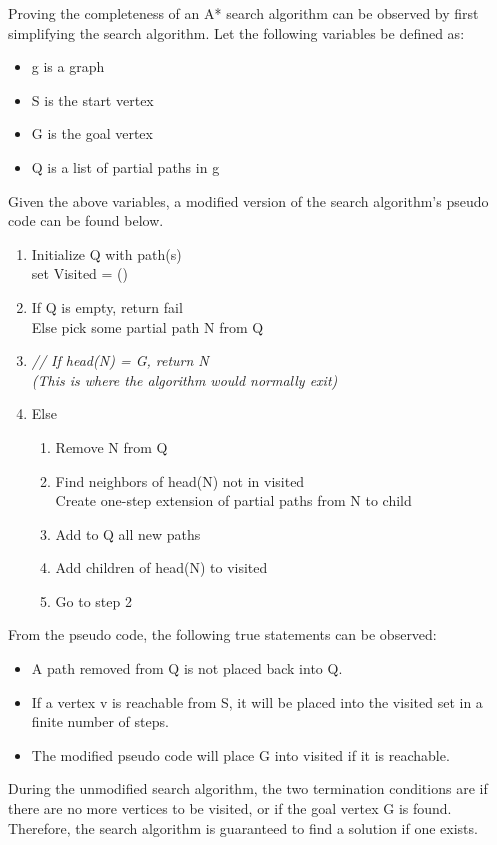 \documentclass[12pt]{article}
\begin{document}
		Proving the completeness of an A* search algorithm can be observed by first simplifying the search algorithm.  Let the following variables be defined as: 
		\begin{itemize}
			\item g is a graph
			\item S is the start vertex
			\item G is the goal vertex
			\item Q is a list of partial paths in g
		\end{itemize}
		Given the above variables, a modified version of the search algorithm's pseudo code can be found below.
		\begin{enumerate}
			\item Initialize Q with path(s)\\
			set Visited = ()
			\item If Q is empty, return fail\\
			Else pick some partial path N from Q
			\item \textit{// If head(N) = G, return N \\ (This is where the algorithm would normally exit)}
			\item Else
			\begin{enumerate}
				\item Remove N from Q
				\item Find neighbors of head(N) not in visited\\
				Create one-step extension of partial paths from N to child
				\item Add to Q all new paths
				\item Add children of head(N) to visited
				\item Go to step 2
			\end{enumerate}
		\end{enumerate}
	
		From the pseudo code, the following true statements can be observed:
		\begin{itemize}
			\item A path removed from Q is not placed back into Q.
			\item If a vertex v is reachable from S, it will be placed into the visited set in a finite number of steps.
			\item The modified pseudo code will place G into visited if it is reachable.
		\end{itemize}
		During the unmodified search algorithm, the two termination conditions are if there are no more vertices to be visited, or if the goal vertex G is found.  Therefore, the search algorithm is guaranteed to find a solution if one exists.  
	
\end{document}
